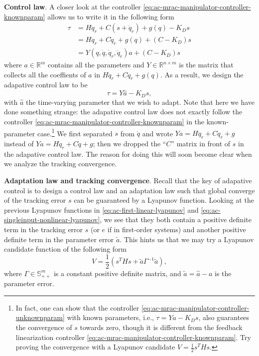 \documentclass[
]{book}
\theoremstyle{definition}
\theoremstyle{definition}
\theoremstyle{definition}
\theoremstyle{definition}
\theoremstyle{remark}
\begin{document}
\textbf{Control law}. A closer look at the controller \eqref{eq:ac-mrac-manipulator-controller-knownparam} allows us to write it in the following form
\begin{align}
\tau &= H \ddot{q}_r + C(s + \dot{q}_r) + g(q) - K_D s  \\
&= H \ddot{q}_r + C \dot{q}_r + g(q) + (C - K_D) s \\
&= Y (q,\dot{q},\dot{q}_r,\ddot{q}_r) a + (C - K_D) s
\end{align}
where \(a \in \mathbb{R}^m\) contains all the parameters and \(Y \in \mathbb{R}^{n \times m}\) is the matrix that collects all the coeffients of \(a\) in \(H \ddot{q}_r + C \dot{q}_r + g(q)\). As a result, we design the adapative control law to be
\begin{equation}
\tau = Y \hat{a} - K_D s,
\label{eq:ac-mrac-manipulator-controller-unknownparam}
\end{equation}
with \(\hat{a}\) the time-varying parameter that we wish to adapt. Note that here we have done something strange: the adapative control law does not exactly follow the controller \eqref{eq:ac-mrac-manipulator-controller-knownparam} in the known-parameter case.\footnote{In fact, one can show that the controller \eqref{eq:ac-mrac-manipulator-controller-unknownparam} with known parameters, i.e., \(\tau = Y a - K_D s\), also guarantees the convergence of \(s\) towards zero, though it is different from the feedback linearization controller \eqref{eq:ac-mrac-manipulator-controller-knownparam}. Try proving the convergence with a Lyapunov candidate \(V = \frac{1}{2}s^T H s\).} We first separated \(s\) from \(\dot{q}\) and wrote \(Ya = H \ddot{q}_r + C \dot{q}_r + g\) instead of \(Ya = H \ddot{q}_r + C \dot{q} + g\); then we dropped the ``\(C\)'' matrix in front of \(s\) in the adapative control law. The reason for doing this will soon become clear when we analyze the tracking convergence.

\textbf{Adaptation law and tracking convergence}.
Recall that the key of adapative control is to design a control law and an adaptation law such that global converge of the tracking error \(s\) can be guaranteed by a Lyapunov function. Looking at the previous Lyapunov functions in \eqref{eq:ac-first-linear-lyapunov} and \eqref{eq:ac-singleinput-nonlinear-lyapunov}, we see that they both contain a positive definite term in the tracking error \(s\) (or \(e\) if in first-order systems) and another positive definite term in the parameter error \(\tilde{a}\). This hints us that we may try a Lyapunov candidate function of the following form
\begin{equation}
V = \frac{1}{2} \left( s^T H s + \tilde{a} \Gamma^{-1} \tilde{a} \right),
\label{eq:ac-mrac-manipulator-controller-unknownparam-lyapunov}
\end{equation}
where \(\Gamma \in \mathbb{S}^m_{++}\) is a constant positive definite matrix, and \(\tilde{a} = \hat{a} - a\) is the parameter error.
\end{document}
